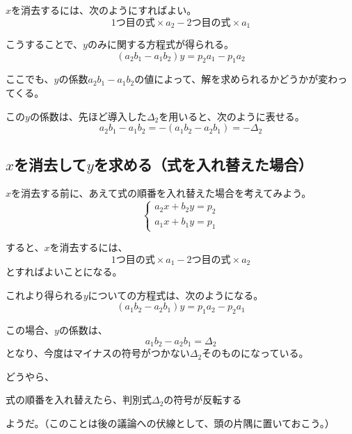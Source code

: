 \documentclass[../../../topic_linear-algebra]{subfiles}
\begin{document}
$x$を消去するには、次のようにすればよい。
\begin{equation*}
  \text{1つ目の式} \times a_2 - \text{2つ目の式} \times a_1
\end{equation*}

こうすることで、$y$のみに関する方程式が得られる。
\begin{equation*}
  (a_2 b_1 - a_1 b_2) y = p_2 a_1 - p_1 a_2
\end{equation*}

ここでも、$y$の係数$a_2 b_1 - a_1 b_2$の値によって、解を求められるかどうかが変わってくる。

この$y$の係数は、先ほど導入した$\Delta_2$を用いると、次のように表せる。
\begin{equation*}
  a_2 b_1 - a_1 b_2 = - (a_1 b_2 - a_2 b_1) = - \Delta_2
\end{equation*}

\subsection{$x$を消去して$y$を求める（式を入れ替えた場合）}

$x$を消去する前に、あえて式の順番を入れ替えた場合を考えてみよう。
\begin{equation*}
  \begin{cases}
    a_2 x + b_2 y = p_2 \\
    a_1 x + b_1 y = p_1
  \end{cases}
\end{equation*}

すると、$x$を消去するには、
\begin{equation*}
  \text{1つ目の式} \times a_1 - \text{2つ目の式} \times a_2
\end{equation*}
とすればよいことになる。

\br

これより得られる$y$についての方程式は、次のようになる。
\begin{equation*}
  (a_1 b_2 - a_2 b_1) y = p_1 a_2 - p_2 a_1
\end{equation*}

この場合、$y$の係数は、
\begin{equation*}
  a_1 b_2 - a_2 b_1 = \Delta_2
\end{equation*}
となり、今度はマイナスの符号がつかない$\Delta_2$そのものになっている。

\br

どうやら、
\begin{emphabox}
  \begin{spacebox}
    \begin{center}
      式の順番を入れ替えたら、判別式$\Delta_2$の符号が反転する
    \end{center}
  \end{spacebox}
\end{emphabox}
ようだ。（このことは後の議論への伏線として、頭の片隅に置いておこう。）
\end{document}
